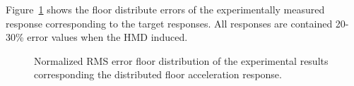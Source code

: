 Figure~\ref{fig:7-17} shows the floor distribute errors of the experimentally measured response corresponding to the target responses. All responses are contained 20-30\% error values when the HMD induced.

\begin{figure}[!ht]
\centering
{}
\caption{Normalized RMS error floor distribution of the experimental results corresponding the distributed floor acceleration response.}
\label{fig:7-17}
\end{figure}

